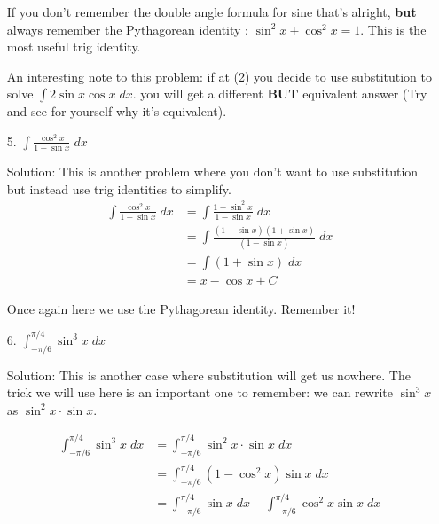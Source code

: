 \documentclass[11pt,reqno]{article}
\theoremstyle{definition}
\begin{document}
\begin{enumerate}
	If you don't remember the double angle formula for sine that's alright, \textbf{but} always remember the Pythagorean identity : $\sin^2 x + \cos^2 x = 1$. This is the most useful trig identity. 
	
	An interesting note to this problem: if at (2) you decide to use substitution to solve $\int 2 \sin x \cos x \; dx$.  you will get a different \textbf{BUT} equivalent answer (Try and see for yourself why it's equivalent).
	
	\newpage
	\item[5.] $\int \frac{\cos^2 x}{1 - \sin x} \; dx$
	
	Solution: This is another problem where you don't want to use substitution but instead use trig identities to simplify. 
	\begin{align*}
		\int \frac{\cos^2 x}{1 - \sin x} \; dx & = \int \frac{1 - \sin^2 x}{1 - \sin x} \; dx \\
											   &= \int \frac{(1 - \sin x) (1 + \sin x)}{(1 - \sin x)} \; dx\\
											   &= \int (1 + \sin x) \; dx \\
											   &= x - \cos x + C 			
	\end{align*}
	
	Once again here we use the Pythagorean identity. Remember it!
	
	\item[6.] $\int_{-\pi/6}^{\pi/4} \sin^3 x \; dx$
	
	Solution: This is another case where substitution will get us nowhere. The trick we will use here is an important one to remember: we can rewrite $\sin^3 x$ as $\sin^2 x \cdot \sin x$. 
	
	\begin{align*}
		\int_{-\pi/6}^{\pi/4} \sin^3 x \; dx &= \int_{-\pi/6}^{\pi/4} \sin^2 x \cdot \sin x \; dx \\
											 &= \int_{-\pi/6}^{\pi/4} (1 - \cos^2 x) \sin x \;dx \\
											 &= \int_{-\pi/6}^{\pi/4} \sin x \;dx - \int_{-\pi/6}^{\pi/4} \cos^2 x \sin x \; dx
	\end{align*}
	

\end{enumerate}
\end{document}
